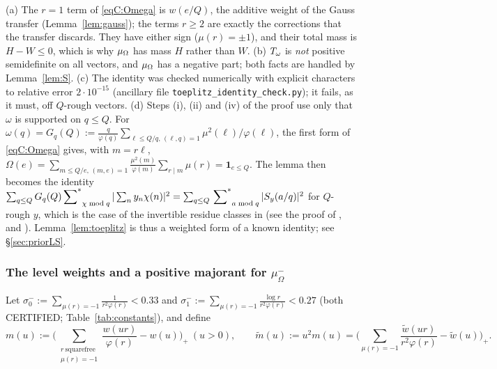 \begin{remark}\label{rem:toeplitz}
(a) The $r=1$ term of \eqref{eqC:Omega} is $w(e/Q)$, the additive weight of the Gauss transfer (Lemma~\ref{lem:gauss}); the terms
$r\ge2$ are exactly the corrections that the transfer discards. They have either sign ($\mu(r)=\pm1$), and their total mass is
$H-W\le0$, which is why $\mu_\Omega$ has mass $H$ rather than $W$.
(b) $T_\omega$ is \emph{not} positive semidefinite on all vectors, and $\mu_\Omega$ has a negative part; both facts are handled by
Lemma~\ref{lem:S}. (c) The identity was checked numerically with explicit characters to relative error $2\cdot10^{-15}$
(ancillary file \texttt{toeplitz\_identity\_check.py}); it fails, as it must, off $Q$-rough vectors.
(d) Steps (i), (ii) and (iv) of the proof use only that $\omega$ is supported on $q\le Q$. For
$\omega(q)=G_q(Q):=\frac q{\varphi(q)}\sum_{\ell\le Q/q,\,(\ell,q)=1}\mu^2(\ell)/\varphi(\ell)$, the first form of \eqref{eqC:Omega} gives, with
$m=r\ell$, $\Omega(e)=\sum_{m\le Q/e,\,(m,e)=1}\frac{\mu^2(m)}{\varphi(m)}\sum_{r\mid m}\mu(r)=\mathbf 1_{e\le Q}$. The lemma then becomes the
identity $\sum_{q\le Q}G_q(Q)\sideset{}{^*}\sum_{\chi\bmod q}|\sum_ny_n\chi(n)|^2=\sum_{q\le Q}\sideset{}{^*}\sum_{a\bmod q}|S_y(a/q)|^2$ for $Q$-rough $y$, which is the
case of the invertible residue classes in \cite[Thm.~2.1]{Ram09} (see the proof of \cite[Thm.~2.3]{Ram09}, and \cite{BD68}).
Lemma~\ref{lem:toeplitz} is thus a weighted form of a known identity; see \S\ref{sec:priorLS}.
\end{remark}

\subsubsection*{The level weights and a positive majorant for $\mu_\Omega^-$}

Let $\sigma^-_0:=\sum_{\mu(r)=-1}\frac1{r^2\varphi(r)}<0.33$ and $\sigma^-_1:=\sum_{\mu(r)=-1}\frac{\log r}{r^2\varphi(r)}<0.27$ (both CERTIFIED;
Table~\ref{tab:constants}), and define
\begin{equation}\label{eqC:m}
 m(u):=\Big(\sum_{\substack{r\ \mathrm{squarefree}\\ \mu(r)=-1}}\frac{w(ur)}{\varphi(r)}-w(u)\Big)_+\ (u>0),\qquad
 \widetilde m(u):=u^2m(u)=\Big(\sum_{\mu(r)=-1}\frac{\widetilde w(ur)}{r^2\varphi(r)}-\widetilde w(u)\Big)_+ .
\end{equation}

